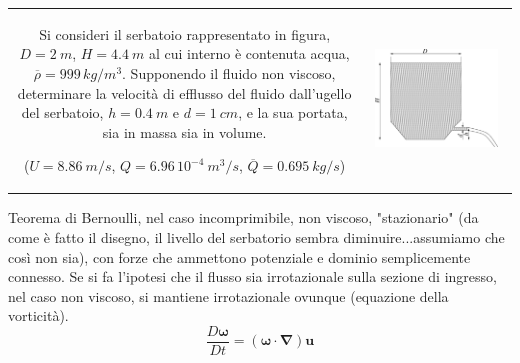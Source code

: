 \noindent
\begin{tabular}{cc}
\begin{minipage}[b]{0.60\textwidth}
\begin{exerciseS}
Si consideri il serbatoio rappresentato in figura, $D=2\ m$, 
$H=4.4\ m$ al cui interno \`{e} contenuta acqua, 
$\overline{\rho}=999\,{kg/m^3}$. 
Supponendo il fluido non viscoso, determinare la velocit\`{a} di 
efflusso del fluido dall'ugello del serbatoio, $h=0.4\ m$ 
e $d = 1\ cm$, e la sua portata, sia in massa sia in volume.

($U = 8.86\ m/s$, $Q=6.96\, 10^{-4}\ m^3/s$, $\overline{Q}=0.695\ kg/s$)
\end{exerciseS}
\end{minipage}
&
\begin{minipage}{0.35\textwidth}
   \begin{center}
   \includegraphics[width=0.90\textwidth]{./fig/serbatoio.eps}
   \end{center}
\end{minipage}
\end{tabular}

\sol

\partone
 Teorema di Bernoulli, nel caso incomprimibile, non viscoso, "stazionario" (da come è
 fatto il disegno, il livello del serbatorio sembra diminuire...assumiamo che così non sia), con forze che ammettono
potenziale e dominio semplicemente connesso.
Se si fa l'ipotesi che il flusso sia irrotazionale sulla sezione di ingresso, nel caso non viscoso, 
si mantiene irrotazionale ovunque (equazione della vorticità).
\begin{equation}
  \frac{D \bm{\omega}}{Dt} = (\bm{\omega} \cdot \bm{\nabla}) \bm{u}
\end{equation}

